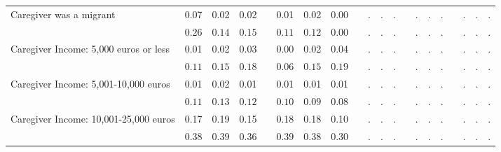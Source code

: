 \begin{center}
{\begin{longtable}{L{6cm} c c c p{.5cm} c c c p{.5cm} c c c p{.5cm} c c c p{.5cm} c c c}
 \quad Caregiver was a migrant & 0.07 &      0.02 &      0.02 & &      0.01 &      0.02 &      0.00 & &         . &         . &         . & &         . &         . &         . & &         . &         . &         . \\*
 \quad & $\mathit{     0.26}$ & $\mathit{     0.14}$ & $\mathit{     0.15}$ & & $\mathit{     0.11}$ & $\mathit{     0.12}$ & $\mathit{     0.00}$ & & $\mathit{        .}$ & $\mathit{        .}$ & $\mathit{        .}$ & & $\mathit{        .}$ & $\mathit{        .}$ & $\mathit{        .}$ & & $\mathit{        .}$ & $\mathit{        .}$ & $\mathit{        .}$ \\[.2em]
 \quad Caregiver Income: 5,000 euros or less & 0.01 &      0.02 &      0.03 & &      0.00 &      0.02 &      0.04 & &         . &         . &         . & &         . &         . &         . & &         . &         . &         . \\*
 \quad & $\mathit{     0.11}$ & $\mathit{     0.15}$ & $\mathit{     0.18}$ & & $\mathit{     0.06}$ & $\mathit{     0.15}$ & $\mathit{     0.19}$ & & $\mathit{        .}$ & $\mathit{        .}$ & $\mathit{        .}$ & & $\mathit{        .}$ & $\mathit{        .}$ & $\mathit{        .}$ & & $\mathit{        .}$ & $\mathit{        .}$ & $\mathit{        .}$ \\[.2em]
 \quad Caregiver Income: 5,001-10,000 euros & 0.01 &      0.02 &      0.01 & &      0.01 &      0.01 &      0.01 & &         . &         . &         . & &         . &         . &         . & &         . &         . &         . \\*
 \quad & $\mathit{     0.11}$ & $\mathit{     0.13}$ & $\mathit{     0.12}$ & & $\mathit{     0.10}$ & $\mathit{     0.09}$ & $\mathit{     0.08}$ & & $\mathit{        .}$ & $\mathit{        .}$ & $\mathit{        .}$ & & $\mathit{        .}$ & $\mathit{        .}$ & $\mathit{        .}$ & & $\mathit{        .}$ & $\mathit{        .}$ & $\mathit{        .}$ \\[.2em]
 \quad Caregiver Income: 10,001-25,000 euros & 0.17 &      0.19 &      0.15 & &      0.18 &      0.18 &      0.10 & &         . &         . &         . & &         . &         . &         . & &         . &         . &         . \\*
 \quad & $\mathit{     0.38}$ & $\mathit{     0.39}$ & $\mathit{     0.36}$ & & $\mathit{     0.39}$ & $\mathit{     0.38}$ & $\mathit{     0.30}$ & & $\mathit{        .}$ & $\mathit{        .}$ & $\mathit{        .}$ & & $\mathit{        .}$ & $\mathit{        .}$ & $\mathit{        .}$ & & $\mathit{        .}$ & $\mathit{        .}$ & $\mathit{        .}$ \\[.2em]

\end{longtable}}
\end{center}
